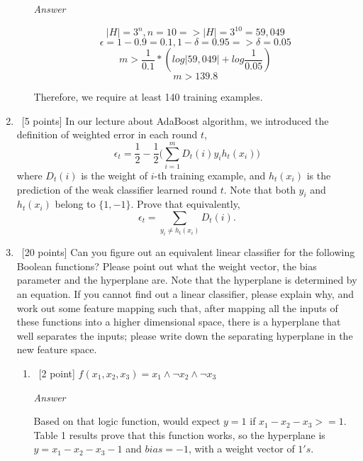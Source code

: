 \documentclass[12pt, fullpage,letterpaper]{article}
\begin{document}
\begin{enumerate}
\begin{enumerate}
	\emph{Answer}
	
	\[
        |H| = 3^{n}, n=10 => |H|=3^{10}=59,049
	\]
	\[
	    \epsilon=1-0.9=0.1, 1-\delta=0.95 => \delta=0.05
	\]
	\[
	    m>\frac{1}{0.1}*(log|59,049|+log\frac{1}{0.05})
	\]
	\[
	    m>139.8
	\]
	
	Therefore, we require at least 140 training examples.
	
\end{enumerate}

\item~[5 points] In our lecture about AdaBoost algorithm, we introduced the definition of weighted error in each round $t$, 
\[
\epsilon_t = \frac{1}{2} - \frac{1}{2}\big(\sum_{i=1}^m D_t(i) y_i h_t(x_i)\big)
\]
where $D_t(i)$ is the weight of $i$-th training example, and $h_t(x_i)$ is the prediction of the weak classifier learned round $t$. Note that both $y_i$ and $h_t(x_i)$ belong to $\{1, -1\}$. Prove that equivalently,
\[
\epsilon_t = \sum_{y_i \neq h_t(x_i)} D_t(i).
\]

\item~[20 points] Can you figure out an equivalent linear classifier for the following Boolean functions? Please point out what the weight vector, the bias parameter and the hyperplane are. Note that the hyperplane is determined by an equation. If you cannot find out a  linear classifier, please explain why, and work out some feature mapping such that, after mapping all the inputs of these functions into a higher dimensional space, there is a hyperplane that well separates the inputs; please write down the separating hyperplane in the new feature space. 
	\begin{enumerate}
		\item~[2 point] $f(x_1, x_2, x_3) = x_1 \land \neg x_2 \land \neg x_3$
		
		\emph{Answer}
		
		Based on that logic function, would expect $y=1$ if $x_1-x_2-x_3>=1$. Table 1 results prove that this function works, so the hyperplane is $y=x_1-x_2-x_3-1$ and $bias=-1$, with a weight vector of $1's$.
		

\end{enumerate}
\end{enumerate}
\end{document}
